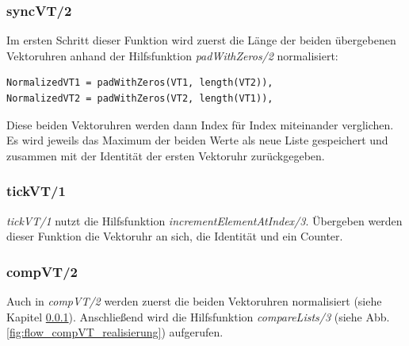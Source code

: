 \subsubsection{syncVT/2} \label{syncVT_realisierung}

Im ersten Schritt dieser Funktion wird zuerst die Länge der beiden übergebenen Vektoruhren anhand der Hilfsfunktion \textit{padWithZeros/2} normalisiert:

\begin{lstlisting}
NormalizedVT1 = padWithZeros(VT1, length(VT2)),
NormalizedVT2 = padWithZeros(VT2, length(VT1)),
\end{lstlisting}

Diese beiden Vektoruhren werden dann Index für Index miteinander verglichen. Es wird jeweils das Maximum der beiden Werte als neue Liste gespeichert und zusammen mit der Identität der ersten Vektoruhr zurückgegeben.

\subsubsection{tickVT/1}

\textit{tickVT/1} nutzt die Hilfsfunktion \textit{incrementElementAtIndex/3}. Übergeben werden dieser Funktion die Vektoruhr an sich, die Identität und ein Counter.

\subsubsection{compVT/2}

Auch in \textit{compVT/2} werden zuerst die beiden Vektoruhren normalisiert (siehe Kapitel \ref{syncVT_realisierung}). 
Anschließend wird die Hilfsfunktion \textit{compareLists/3} (siehe Abb. \ref{fig:flow_compVT_realisierung}) aufgerufen.


